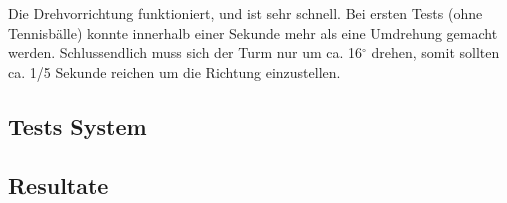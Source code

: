Die Drehvorrichtung funktioniert, und ist sehr schnell. Bei ersten Tests (ohne Tennisbälle) konnte innerhalb einer Sekunde mehr als eine Umdrehung gemacht werden. Schlussendlich muss sich der Turm nur um ca. 16$^\circ$ drehen, somit sollten ca. 1/5 Sekunde reichen um die Richtung einzustellen.



\subsection{Tests System}

\subsection{Resultate}
